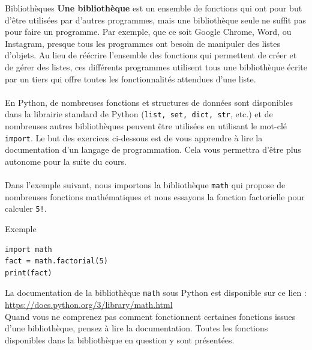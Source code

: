 \begin{section}{Bibliothèques}
    \textbf{Une bibliothèque} est un ensemble de fonctions qui ont pour but d'être utilisées par d'autres programmes, mais une bibliothèque seule ne suffit pas pour faire un programme. Par exemple, que ce soit Google Chrome, Word, ou Instagram, presque tous les programmes ont besoin de manipuler des listes d'objets. Au lieu de réécrire l'ensemble des fonctions qui permettent de créer et de gérer des listes, ces différents programmes utilisent tous une bibliothèque écrite par un tiers qui offre toutes les fonctionnalités attendues d'une liste.
\\\\
En Python, de nombreuses fonctions et structures de données sont disponibles dans la librairie standard de Python (\lstinline{list, set, dict, str}, etc.) et de nombreuses autres bibliothèques peuvent être utilisées en utilisant le mot-clé \lstinline{import}. Le but des exercices ci-dessous est de vous apprendre à lire la documentation d'un langage de programmation. Cela vous permettra d'être plus autonome pour la suite du cours.
\\\\
Dans l'exemple suivant, nous importons la bibliothèque \lstinline{math} qui propose de nombreuses fonctions mathématiques et nous essayons la fonction factorielle pour calculer \lstinline{5!}.
\begin{Example}{\faTerminal Exemple}
    \begin{lstlisting}
import math
fact = math.factorial(5)
print(fact)\end{lstlisting}
\end{Example}

\begin{conseil}
	La documentation de la bibliothèque \lstinline{math} sous Python est disponible sur ce lien : \url{https://docs.python.org/3/library/math.html} \\
Quand vous ne comprenez pas comment fonctionnent certaines fonctions issues d'une bibliothèque, pensez à lire la documentation. Toutes les fonctions disponibles dans la bibliothèque en question y sont présentées.


\end{conseil}
\end{section}
